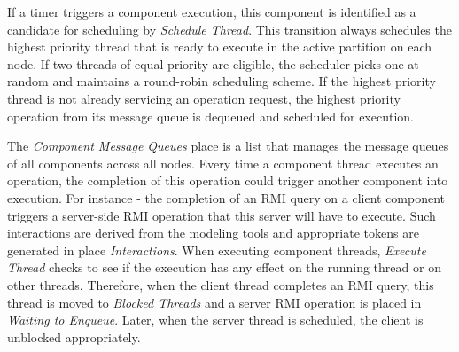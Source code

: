 If a timer triggers a component execution, this component is identified as a candidate for scheduling by \emph{Schedule Thread}. This transition always schedules the highest priority thread that is ready to execute in the active partition on each node. If two threads of equal priority are eligible, the scheduler picks one at random and maintains a round-robin scheduling scheme. If the highest priority thread is not already servicing an operation request, the highest priority operation from its message queue is dequeued and scheduled for execution.

The \emph{Component Message Queues} place is a list that manages the message queues of all components across all nodes. Every time a component thread executes an operation, the completion of this operation could trigger another component into execution. For instance - the completion of an RMI query on a client component triggers a server-side RMI operation that this server will have to execute. Such interactions are derived from the modeling tools and appropriate tokens are generated in place \emph{Interactions}. When executing component threads, \emph{Execute Thread} checks to see if the execution has any effect on the running thread or on other threads. Therefore, when the client thread completes an RMI query, this thread is moved to \emph{Blocked Threads} and a server RMI operation is placed in \emph{Waiting to Enqueue}. Later, when the server thread is scheduled, the client is unblocked appropriately.





